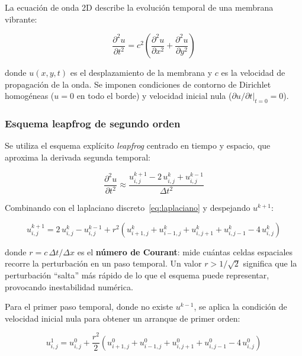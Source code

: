 \documentclass[12pt, a4paper]{article}
\begin{document}
La ecuación de onda 2D describe la evolución temporal de una membrana vibrante:

\begin{equation}
    \frac{\partial^2 u}{\partial t^2} = c^2
    \left(\frac{\partial^2 u}{\partial x^2} + \frac{\partial^2 u}{\partial y^2}\right)
    \label{eq:onda2d}
\end{equation}

donde $u(x,y,t)$ es el desplazamiento de la membrana y $c$ es la velocidad de
propagación de la onda. Se imponen condiciones de contorno de Dirichlet homogéneas
($u = 0$ en todo el borde) y velocidad inicial nula ($\partial u/\partial t\big|_{t=0}
= 0$).

\subsubsection{Esquema leapfrog de segundo orden}

Se utiliza el esquema explícito \textit{leapfrog} centrado en tiempo y espacio, que
aproxima la derivada segunda temporal:

\begin{equation}
    \frac{\partial^2 u}{\partial t^2} \approx
    \frac{u^{k+1}_{i,j} - 2\,u^k_{i,j} + u^{k-1}_{i,j}}{\Delta t^2}
\end{equation}

Combinando con el laplaciano discreto~\eqref{eq:laplaciano} y despejando $u^{k+1}$:

\begin{equation}
    u^{k+1}_{i,j} = 2\,u^k_{i,j} - u^{k-1}_{i,j}
    + r^2\!\left(u^k_{i+1,j} + u^k_{i-1,j} + u^k_{i,j+1} + u^k_{i,j-1}
    - 4\,u^k_{i,j}\right)
    \label{eq:leapfrog}
\end{equation}

donde $r = c\,\Delta t / \Delta x$ es el \textbf{número de Courant}: mide cuántas
celdas espaciales recorre la perturbación en un paso temporal. Un valor $r > 1/\sqrt{2}$
significa que la perturbación ``salta'' más rápido de lo que el esquema puede
representar, provocando inestabilidad numérica.

Para el primer paso temporal, donde no existe $u^{k-1}$, se aplica la condición de
velocidad inicial nula para obtener un arranque de primer orden:

\begin{equation}
    u^1_{i,j} = u^0_{i,j} + \frac{r^2}{2}
    \left(u^0_{i+1,j} + u^0_{i-1,j} + u^0_{i,j+1} + u^0_{i,j-1}
    - 4\,u^0_{i,j}\right)
\end{equation}
\end{document}
